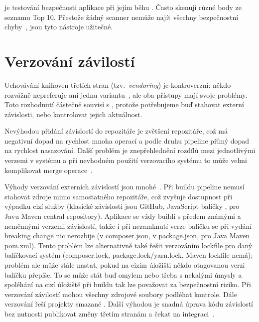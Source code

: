          je testování bezpečnosti aplikace při jejím běhu \cite{dast}. Často skenují různé body ze seznamu  Top 10. Přestože žádný scanner nemůže najít všechny bezpečnostní chyby~\cite{netsparker-scanner}, jsou tyto nástroje užitečné.

    \section*{Verzování závilostí}
        Uchovávání knihoven třetích stran (tzv.~\textit{vendoring}) je kontroverzní: někdo rozvážně nepreferuje ani jednu variantu~\cite{copes-commit-npm}, ale oba přístupy mají svoje problémy. Toto rozhodnutí částečně souvisí s \CI, protože potřebujeme buď stahovat externí závislosti, nebo kontrolovat jejich aktuálnost.


        Nevýhodou přidání závislostí do repozitáře je zvětšení repozitáře, což má negativní dopad na rychlost mnoha operací a podle druhu \CICD pipeline přímý dopad na rychlost nasazování. Další problém je znepřehlednění rozdílů mezi jednotlivými verzemi v systému a při nevhodném použití verzovacího systému to může velmi komplikovat merge operace~\cite{should-i-vendor}.

        Výhody verzování externích závislostí jsou mnohé~\cite{andrawos2017cloud}. Při buildu \CICD pipeline nemusí stahovat zdroje mimo samostatného repozitáře, což zvyšuje dostupnost při výpadku cizí služby (klasické závislosti jsou GitHub, JavaScript balíčky , pro Javu Maven central repository). Aplikace se vždy buildí s předem známými a neměnnými verzemi závislostí, takže i při nezamknutí verze balíčku se při vydání breaking change nic nerozbije (v  composer.json, v  package.json, pro Java Maven pom.xml). Tento problém lze alternativně také řešit verzováním lockfile pro daný balíčkovací systém (composer.lock, package.lock/yarn.lock, Maven lockfile nemá); problém ale může stále nastat, pokud na cizím úložišti někdo otagovanou verzi balíčku přepíše. To se může stát buď omylem nebo třeba s nekalými úmysly a spoléhání na cizí úložiště při buildu tak lze považovat za bezpečnostní riziko. Při verzování závilostí mohou všechny zdrojové soubory podléhat kontrole. Dále verzování řeší projekty smazané \cite{williams-left-pad}. Další výhodou je snadná úprava kódu závislostí bez nutnosti publikovat změny třetím stranám a čekat na integraci~\cite{rusnavcko2014fedora}.
